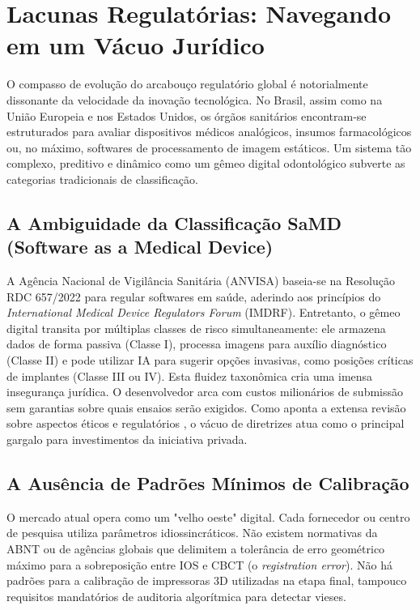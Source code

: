\section{Lacunas Regulatórias: Navegando em um Vácuo Jurídico}

O compasso de evolução do arcabouço regulatório global é notorialmente dissonante da velocidade da inovação tecnológica. No Brasil, assim como na União Europeia e nos Estados Unidos, os órgãos sanitários encontram-se estruturados para avaliar dispositivos médicos analógicos, insumos farmacológicos ou, no máximo, softwares de processamento de imagem estáticos. Um sistema tão complexo, preditivo e dinâmico como um gêmeo digital odontológico subverte as categorias tradicionais de classificação.

\subsection{A Ambiguidade da Classificação SaMD (Software as a Medical Device)}

A Agência Nacional de Vigilância Sanitária (ANVISA) baseia-se na Resolução RDC 657/2022 para regular softwares em saúde, aderindo aos princípios do \textit{International Medical Device Regulators Forum} (IMDRF). Entretanto, o gêmeo digital transita por múltiplas classes de risco simultaneamente: ele armazena dados de forma passiva (Classe I), processa imagens para auxílio diagnóstico (Classe II) e pode utilizar IA para sugerir opções invasivas, como posições críticas de implantes (Classe III ou IV). Esta fluidez taxonômica cria uma imensa insegurança jurídica. O desenvolvedor arca com custos milionários de submissão sem garantias sobre quais ensaios serão exigidos. Como aponta a extensa revisão sobre aspectos éticos e regulatórios \cite{springer2026realising}, o vácuo de diretrizes atua como o principal gargalo para investimentos da iniciativa privada.

\subsection{A Ausência de Padrões Mínimos de Calibração}

O mercado atual opera como um "velho oeste" digital. Cada fornecedor ou centro de pesquisa utiliza parâmetros idiossincráticos. Não existem normativas da ABNT ou de agências globais que delimitem a tolerância de erro geométrico máximo para a sobreposição entre IOS e CBCT (o \textit{registration error}). Não há padrões para a calibração de impressoras 3D utilizadas na etapa final, tampouco requisitos mandatórios de auditoria algorítmica para detectar vieses.

